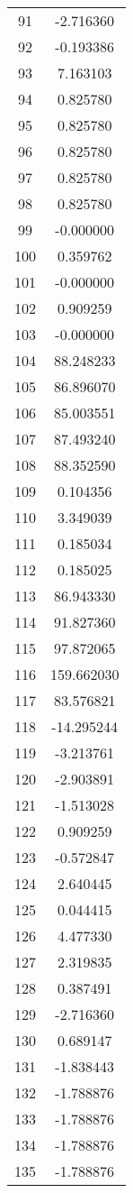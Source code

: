 \documentclass[12pt]{article}
\begin{document}
\begin{longtable}{@{}cc@{}}
91 & -2.716360 \\
92 & -0.193386 \\
93 & 7.163103 \\
94 & 0.825780 \\
95 & 0.825780 \\
96 & 0.825780 \\
97 & 0.825780 \\
98 & 0.825780 \\
99 & -0.000000 \\
100 & 0.359762 \\
101 & -0.000000 \\
102 & 0.909259 \\
103 & -0.000000 \\
104 & 88.248233 \\
105 & 86.896070 \\
106 & 85.003551 \\
107 & 87.493240 \\
108 & 88.352590 \\
109 & 0.104356 \\
110 & 3.349039 \\
111 & 0.185034 \\
112 & 0.185025 \\
113 & 86.943330 \\
114 & 91.827360 \\
115 & 97.872065 \\
116 & 159.662030 \\
117 & 83.576821 \\
118 & -14.295244 \\
119 & -3.213761 \\
120 & -2.903891 \\
121 & -1.513028 \\
122 & 0.909259 \\
123 & -0.572847 \\
124 & 2.640445 \\
125 & 0.044415 \\
126 & 4.477330 \\
127 & 2.319835 \\
128 & 0.387491 \\
129 & -2.716360 \\
130 & 0.689147 \\
131 & -1.838443 \\
132 & -1.788876 \\
133 & -1.788876 \\
134 & -1.788876 \\
135 & -1.788876 \\

\end{longtable}
\end{document}
